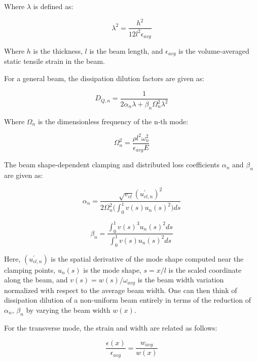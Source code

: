 \documentclass[%
 reprint,
nofootinbib,
 amsmath,amssymb,
 aps,
]{revtex4-2}
\begin{document}
Where $\lambda$ is defined as:

\begin{equation*}
    \lambda^2 = \frac{h^2}{12 l^2 \epsilon_{avg} }
\end{equation*}

Where $h$ is the thickness, $l$ is the beam length, and $\epsilon_{avg}$ is the volume-averaged static tensile strain in the beam.

For a general beam, the dissipation dilution factors are given as:

\begin{equation*}
    D_{Q,n} = \frac{1}{2\alpha_n \lambda + \beta_n \Omega_n^2 \lambda^2}
\end{equation*}

Where $\Omega_n$ is the dimensionless frequency of the n-th mode:

\begin{equation*}
    \Omega_n^2 = \frac{\rho l^2 \omega_n^2}{\epsilon_{avg} E}
\end{equation*}

The beam shape-dependent clamping and distributed loss coefficients $\alpha_n$ and $\beta_n$ are given as:

\begin{equation*}
    \alpha_n = \frac{\sqrt{v_{cl}} (u^{'}_{cl,n})^2}{2\Omega_n^2 \big ( \int_{0}^{1} v(s) u_n(s)^2 \big ) ds}
\end{equation*}

\begin{equation*}
    \beta_n = \frac{\int_{0}^{1} v(s)^3 u_{n}(s)^2 ds}{\int_{0}^{1} v(s) u_{n}(s)^2 ds}
\end{equation*}

Here, $(u^{'}_{cl,n})$ is the spatial derivative of the mode shape computed near the clamping points, $u_n(s)$ is the mode shape, $s = x/l$ is the scaled coordinate along the beam, and $v(s) = w(s)/\omega_{avg}$ is the beam width variation normalized with respect to the average beam width. One can then think of dissipation dilution of a non-uniform beam entirely in terms of the reduction of $\alpha_n$, $\beta_n$ by varying the beam width $w(x)$. 
\newline

For the transverse mode, the strain and width are related as follows:

\begin{equation*}
    \frac{\epsilon(x)}{\epsilon_{avg}} = \frac{w_{avg}}{w(x)}
\end{equation*}
\end{document}
